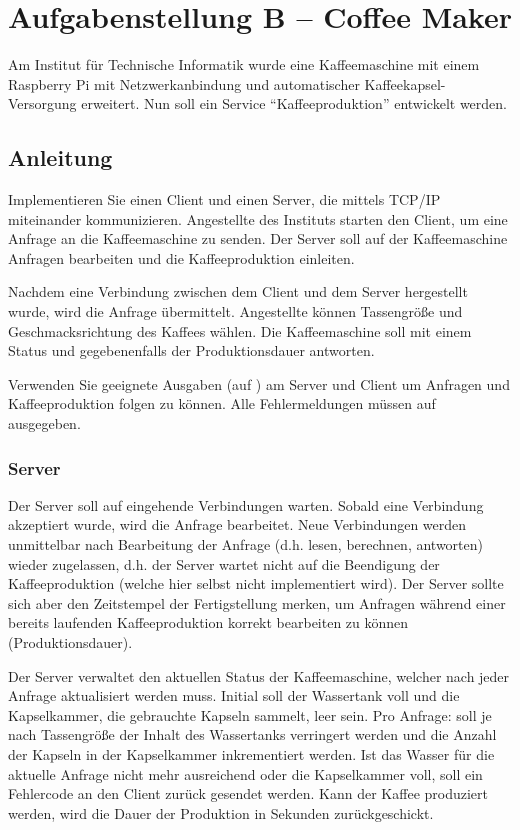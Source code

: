 



\section*{Aufgabenstellung B -- Coffee Maker}\label{sec:aufgabenstellung}

Am Institut für Technische Informatik wurde eine Kaffeemaschine mit einem
Raspberry Pi mit Netzwerkanbindung und automatischer Kaffeekapsel-Versorgung
erweitert. Nun soll ein Service ``Kaffeeproduktion'' entwickelt werden.

\subsection*{Anleitung}
Implementieren Sie einen Client und einen Server, die mittels TCP/IP
miteinander kommunizieren. Angestellte des Instituts starten den Client, um
eine Anfrage an die Kaffeemaschine zu senden. Der Server soll auf der
Kaffeemaschine Anfragen bearbeiten und die Kaffeeproduktion einleiten.

Nachdem eine Verbindung zwischen dem Client und dem Server hergestellt wurde,
wird die Anfrage übermittelt. Angestellte können Tassengröße und
Geschmacksrichtung des Kaffees wählen. Die Kaffeemaschine soll mit einem Status
und gegebenenfalls der Produktionsdauer antworten.

Verwenden Sie geeignete Ausgaben (auf ) am Server und Client
um Anfragen und Kaffeeproduktion folgen zu können. Alle Fehlermeldungen müssen
auf  ausgegeben.

\subsubsection*{Server}
Der Server soll auf eingehende Verbindungen warten. Sobald eine Verbindung
akzeptiert wurde, wird die Anfrage bearbeitet. Neue Verbindungen werden
unmittelbar nach Bearbeitung der Anfrage (d.h. lesen, berechnen, antworten)
wieder zugelassen, d.h. der Server wartet nicht auf die Beendigung der
Kaffeeproduktion (welche hier selbst nicht implementiert wird). Der Server
sollte sich aber den Zeitstempel der Fertigstellung merken, um Anfragen während
einer bereits laufenden Kaffeeproduktion korrekt bearbeiten zu können
(Produktionsdauer).

Der Server verwaltet den aktuellen Status der Kaffeemaschine, welcher nach
jeder Anfrage aktualisiert werden muss. Initial soll der Wassertank voll und
die Kapselkammer, die gebrauchte Kapseln sammelt, leer sein. Pro Anfrage: soll
je nach Tassengröße der Inhalt des Wassertanks verringert werden und die Anzahl
der Kapseln in der Kapselkammer inkrementiert werden. Ist das Wasser für die
aktuelle Anfrage nicht mehr ausreichend oder die Kapselkammer voll, soll ein
Fehlercode an den Client zurück gesendet werden. Kann der Kaffee produziert
werden, wird die Dauer der Produktion in Sekunden zurückgeschickt.

